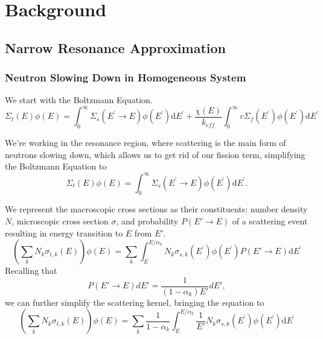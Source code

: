 \documentclass[10pt]{article}
\begin{document}
\section{Background}



\subsection{Narrow Resonance Approximation}

\subsubsection{Neutron Slowing Down in Homogeneous System}
We start with the Boltzmann Equation.
\begin{equation}\Sigma_{t}(E)\phi(E)=\int_{0}^{\infty}\Sigma_{s}\left(E^{\prime}\rightarrow E\right)\phi\left(E^{\prime}\right)\mathrm{d}E^{\prime}+\frac{\chi(E)}{k_{eff}}\int_{0}^{\infty}v\Sigma_{f}\left(E^{\prime}\right)\phi\left(E^{\prime}\right)\mathrm{d}E^{\prime}\end{equation}

We're working in the resonance region, where scattering is the main form of neutrons slowing down, which allows us to get rid of our fission term, simplifying the Boltzmann Equation to
\begin{equation}\Sigma_{t}(E)\phi(E)=\int_{0}^{\infty}\Sigma_{s}\left(E^{\prime}\rightarrow E\right)\phi\left(E^{\prime}\right)\mathrm{d}E^{\prime}.\end{equation}

We represent the macroscopic cross sections as their constituents: number density $N$, microscopic cross section $\sigma$, and probability $P(E'\rightarrow E)$ of a scattering event resulting in energy transition to $E$ from $E'$.
\begin{equation}\left(\sum\limits_{k}N_{k}\sigma_{t,k}(E)\right)\phi(E)=\sum\limits_{k}\int_{E}^{E/\alpha_{k}}N_{k}\sigma_{s,k}\left(E^{\prime}\right)\phi\left(E^{\prime}\right)P(E'\rightarrow E)\mathrm{d}E^{\prime}\end{equation}
Recalling that 
\begin{equation}P(E'\rightarrow E)dE'=\frac{1}{(1-\alpha_k)E'}dE',\end{equation}
we can further simplify the scattering kernel, bringing the equation to
\begin{equation}\left(\sum\limits_{k}N_{k}\sigma_{t,k}(E)\right)\phi(E)=\sum\limits_{k}\frac{1}{1-\alpha_{k}}\int_{E}^{E/\alpha_{k}}\frac{1}{E'}N_{k}\sigma_{s,k}\left(E^{\prime}\right)\phi\left(E^{\prime}\right)\mathrm{d}E^{\prime}\end{equation}
\end{document}
